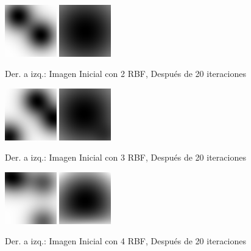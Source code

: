 \documentclass[10pt,journal,compsoc]{styles/IEEEtran}
\begin{document}
\begin{figure}[H]
	\centering
	\includegraphics[width=0.20\textwidth]{GN2_0.png}
	\includegraphics[width=0.20\textwidth]{GN2_20.png}
	\caption{Der. a izq.: Imagen Inicial con 2 RBF, Después de 20 iteraciones}
\end{figure}

\begin{figure}[H]
	\centering
	\includegraphics[width=0.20\textwidth]{GN3_0.png}
	\includegraphics[width=0.20\textwidth]{GN3_20.png}
	\caption{Der. a izq.: Imagen Inicial con 3 RBF, Después de 20 iteraciones}
\end{figure}

\begin{figure}[H]
	\centering
	\includegraphics[width=0.20\textwidth]{GN4_0.png}
	\includegraphics[width=0.20\textwidth]{GN4_20.png}
	\caption{Der. a izq.: Imagen Inicial con 4 RBF, Después de 20 iteraciones}
\end{figure}
\end{document}

